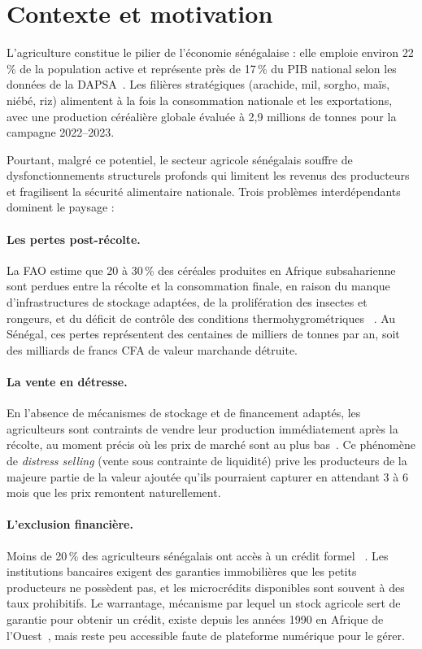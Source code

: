 \documentclass[12pt,a4paper,twoside]{report}
\begin{document}
\section{Contexte et motivation}

L'agriculture constitue le pilier de l'économie sénégalaise : elle emploie
environ 22\,\% de la population active et représente près de 17\,\% du PIB
national selon les données de la DAPSA~\cite{dapsa2023}. Les filières
stratégiques (arachide, mil, sorgho, maïs, niébé, riz) alimentent à la
fois la consommation nationale et les exportations, avec une production céréalière
globale évaluée à 2,9 millions de tonnes pour la campagne 2022--2023.

Pourtant, malgré ce potentiel, le secteur agricole sénégalais souffre de
dysfonctionnements structurels profonds qui limitent les revenus des producteurs
et fragilisent la sécurité alimentaire nationale. Trois problèmes interdépendants
dominent le paysage :

\paragraph{Les pertes post-récolte.}
La FAO estime que 20 à 30\,\% des céréales produites en Afrique subsaharienne
sont perdues entre la récolte et la consommation finale, en raison du manque
d'infrastructures de stockage adaptées, de la prolifération des insectes et
rongeurs, et du déficit de contrôle des conditions thermohygrométriques
~\cite{fao2019postharvest}. Au Sénégal, ces pertes représentent des centaines
de milliers de tonnes par an, soit des milliards de francs CFA de valeur
marchande détruite.

\paragraph{La vente en détresse.}
En l'absence de mécanismes de stockage et de financement adaptés, les agriculteurs
sont contraints de vendre leur production immédiatement après la récolte, au moment
précis où les prix de marché sont au plus bas~\cite{jayne2010distress}. Ce
phénomène de \emph{distress selling} (vente sous contrainte de liquidité)
prive les producteurs de la majeure partie de la valeur ajoutée qu'ils pourraient
capturer en attendant 3 à 6 mois que les prix remontent naturellement.

\paragraph{L'exclusion financière.}
Moins de 20\,\% des agriculteurs sénégalais ont accès à un crédit formel
~\cite{worldbank2022senegal}. Les institutions bancaires exigent des garanties
immobilières que les petits producteurs ne possèdent pas, et les microcrédits
disponibles sont souvent à des taux prohibitifs. Le warrantage, mécanisme par lequel un stock agricole sert de garantie pour obtenir un crédit, existe depuis
les années 1990 en Afrique de l'Ouest~\cite{wfp2010warrantage,coulter2009warrantage},
mais reste peu accessible faute de plateforme numérique pour le gérer.
\end{document}
